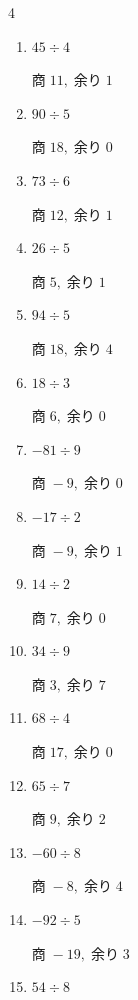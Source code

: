 \begin{multicols}{4}
\begin{enumerate}
        $商\; -10,\; 余り\; 2$

  \item $45 \div 4$

        $商\; 11,\; 余り\; 1$

  \item $90 \div 5$

        $商\; 18,\; 余り\; 0$

  \item $73 \div 6$

        $商\; 12,\; 余り\; 1$

  \item $26 \div 5$

        $商\; 5,\; 余り\; 1$

  \item $94 \div 5$

        $商\; 18,\; 余り\; 4$

  \item $18 \div 3$

        $商\; 6,\; 余り\; 0$

  \item $-81 \div 9$

        $商\; -9,\; 余り\; 0$

\columnbreak %

  \item $-17 \div 2$

        $商\; -9,\; 余り\; 1$

  \item $14 \div 2$

        $商\; 7,\; 余り\; 0$

  \item $34 \div 9$

        $商\; 3,\; 余り\; 7$

  \item $68 \div 4$

        $商\; 17,\; 余り\; 0$

  \item $65 \div 7$

        $商\; 9,\; 余り\; 2$

  \item $-60 \div 8$

        $商\; -8,\; 余り\; 4$

  \item $-92 \div 5$

        $商\; -19,\; 余り\; 3$

  \item $54 \div 8$


\end{enumerate}
\end{multicols}
